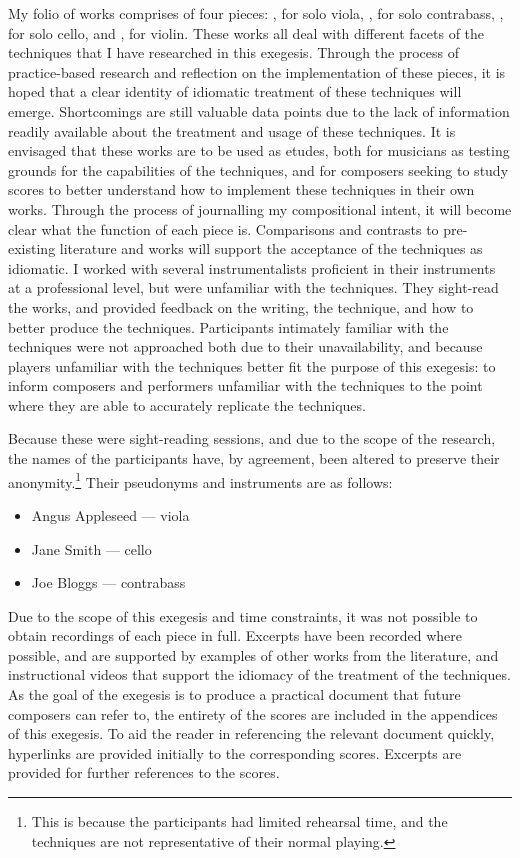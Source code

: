 My folio of works comprises of four pieces: , for solo viola, , for solo contrabass, , for solo cello, and , for violin. 
These works all deal with different facets of the techniques that I have researched in this exegesis. 
Through the process of practice-based research and reflection on the implementation of these pieces, it is hoped that a clear identity of idiomatic treatment of these techniques will emerge.
Shortcomings are still valuable data points due to the lack of information readily available about the treatment and usage of these techniques.
It is envisaged that these works are to be used as etudes, both for musicians as testing grounds for the capabilities of the techniques, and for composers seeking to study scores to better understand how to implement these techniques in their own works.
Through the process of journalling my compositional intent, it will become clear what the function of each piece is.
Comparisons and contrasts to pre-existing literature and works will support the acceptance of the techniques as idiomatic.
I worked with several instrumentalists proficient in their instruments at a professional level, but were unfamiliar with the techniques.
They sight-read the works, and provided feedback on the writing, the technique, and how to better produce the techniques.
Participants intimately familiar with the techniques were not approached both due to their unavailability, and because players unfamiliar with the techniques better fit the purpose of this exegesis: 
to inform composers and performers unfamiliar with the techniques to the point where they are able to accurately replicate the techniques.

Because these were sight-reading sessions, and due to the scope of the research, the names of the participants have, by agreement, been altered to preserve their anonymity.\footnote{This is because the participants had limited rehearsal time, and 
the techniques are not representative of their normal playing.}
Their pseudonyms and instruments are as follows:

\begin{itemize}
  \item Angus Appleseed --- viola
  \item Jane Smith --- cello
  \item Joe Bloggs --- contrabass
\end{itemize}

Due to the scope of this exegesis and time constraints, it was not possible to obtain recordings of each piece in full.
Excerpts have been recorded where possible, and are supported by examples of other works from the literature, and instructional videos that support the idiomacy of the treatment of the techniques.
As the goal of the exegesis is to produce a practical document that future composers can refer to, the entirety of the scores are included in the appendices of this exegesis.
To aid the reader in referencing the relevant document quickly, hyperlinks are provided initially to the corresponding scores. 
Excerpts are provided for further references to the scores.

